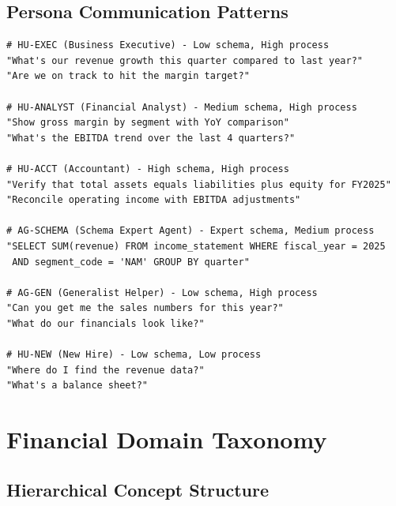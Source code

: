 \subsection{Persona Communication Patterns}

\begin{lstlisting}[language=jsonx,caption={Example prompts by persona}]
# HU-EXEC (Business Executive) - Low schema, High process
"What's our revenue growth this quarter compared to last year?"
"Are we on track to hit the margin target?"

# HU-ANALYST (Financial Analyst) - Medium schema, High process  
"Show gross margin by segment with YoY comparison"
"What's the EBITDA trend over the last 4 quarters?"

# HU-ACCT (Accountant) - High schema, High process
"Verify that total assets equals liabilities plus equity for FY2025"
"Reconcile operating income with EBITDA adjustments"

# AG-SCHEMA (Schema Expert Agent) - Expert schema, Medium process
"SELECT SUM(revenue) FROM income_statement WHERE fiscal_year = 2025 
 AND segment_code = 'NAM' GROUP BY quarter"

# AG-GEN (Generalist Helper) - Low schema, High process
"Can you get me the sales numbers for this year?"
"What do our financials look like?"

# HU-NEW (New Hire) - Low schema, Low process
"Where do I find the revenue data?"
"What's a balance sheet?"
\end{lstlisting}

\section{Financial Domain Taxonomy}
\label{sec:financial-taxonomy}

\subsection{Hierarchical Concept Structure}

